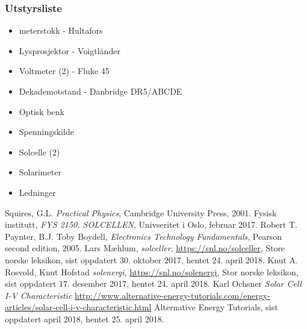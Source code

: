 \documentclass[%
 reprint,
 amsmath,amssymb,
 aps,
 norsk,
 booktabs
]{revtex4-1}
\begin{document}
\subsubsection*{Utstyrsliste}
\begin{itemize}
\label{utstyr}
\item meterstokk - Hultafors
\item Lysprosjektor - Voigtländer
\item Voltmeter (2) - Fluke 45
\item Dekademotstand - Danbridge DR5/ABCDE
\item Optisk benk
\item Spenningskilde
\item Solcelle (2)
\item Solarimeter
\item Ledninger
\end{itemize}
\begin{thebibliography}{9}
Squires, G.L. \emph{Practical Physics}, Cambridge University Press, 2001.
Fysisk institutt, \emph{FYS 2150. SOLCELLEN}, Univseritet i Oslo, februar 2017.
Robert T. Paynter, B.J. Toby Boydell, \emph{Electronics Technology Fundamentals}, Pearson second edition, 2005.
Lars Mæhlum, \emph{solceller}, \url{https://snl.no/solceller}, Store norske leksikon, sist oppdatert 30. oktober 2017, hentet 24. april 2018.
Knut A. Rosvold, Knut Hofstad \emph{solenergi}, \url{https://snl.no/solenergi}, Stor norske leksikon, sist oppdatert 17. desember 2017, hentet 24. april 2018.
Karl Ochsner \emph{Solar Cell I-V Characteristic} \url{http://www.alternative-energy-tutorials.com/energy-articles/solar-cell-i-v-characteristic.html} Alternative Energy Tutorials, sist oppdatert april 2018, hentet 25. april 2018.
\end{thebibliography}
\end{document}
